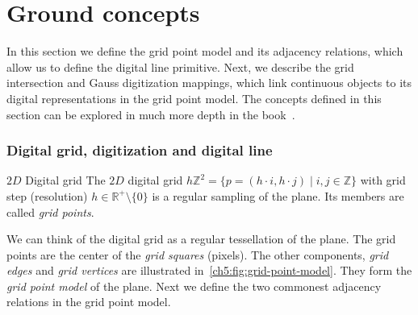 \section{Ground concepts}\label{ch5:sec:ground-concepts}

In this section we define the grid point model and its adjacency relations, which allow us to define the digital line primitive. Next, we describe the grid intersection and Gauss digitization mappings, which link continuous objects to its digital representations in the grid point model. The concepts defined in this section can be explored in much more depth in the book~\cite{klette04digital}.

\subsubsection{Digital grid, digitization and digital line}

\begin{definition}{$2D$ Digital grid}
The $2D$ digital grid $h\mathbb{Z}^2 = \{ p = (h \cdot i,h \cdot j) \; | \; i,j \in \mathbb{Z}\}$ with grid step (resolution) $h \in \mathbb{R}^+ \setminus \{0\}$ is a regular sampling of the plane. Its members are called \emph{grid points}.
\end{definition}

We can think of the digital grid as a regular tessellation of the plane. The grid points are the center of the \emph{grid squares} (pixels). The other components, \emph{grid edges } and \emph{grid vertices} are illustrated in~\cref{ch5:fig:grid-point-model}. They form the \emph{grid point model} of the plane. Next we define the two commonest adjacency relations in the grid point model.

